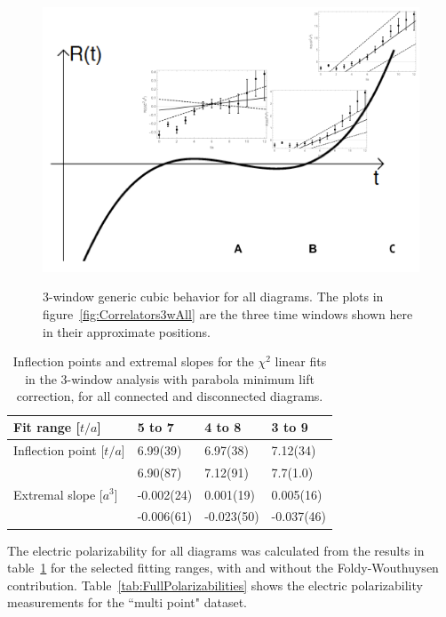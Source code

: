 \begin{figure}[H]
\centering
\includegraphics[width=.65\linewidth]{figures/full3window.png}
\\
\caption{3-window generic cubic behavior for all diagrams. The plots in figure~\ref{fig:Correlators3wAll} 
are the three time windows shown here in their approximate positions.}
\label{fig:CubicAll}
\end{figure}

\begin{table}[H]
\begin{center}
    \begin{tabular}{ | l | l| l | l |}
    \hline
     Fit range [$t/a$] 			& 5 to 7   		& 4 to 8   		& 3 to 9  \\ \hline
     Inflection point [$t/a$]		&  6.99(39)   	&  6.97(38)    	& 7.12(34)    \\ 
     						& 6.90(87)		& 7.12(91)		& 7.7(1.0)	\\ \hline
     Extremal slope [$a^3$]		&   -0.002(24)   & 0.001(19)   	& 0.005(16)  \\
     						& -0.006(61)	& -0.023(50)	& -0.037(46) \\ \hline
    \end{tabular}
\end{center}
\caption{Inflection points and extremal slopes for the $\chi^2$ linear fits in the 3-window analysis with parabola minimum lift correction, for all connected and disconnected diagrams. }
\label{tab:ExtremaMultiPointAll}
\end{table}
The electric polarizability for all diagrams was calculated from 
the results in table~\ref{tab:ExtremaMultiPointAll}
for the selected fitting ranges, with and without the Foldy-Wouthuysen contribution.
Table~\ref{tab:FullPolarizabilities} shows the electric polarizability 
measurements for the ``multi point" dataset.

